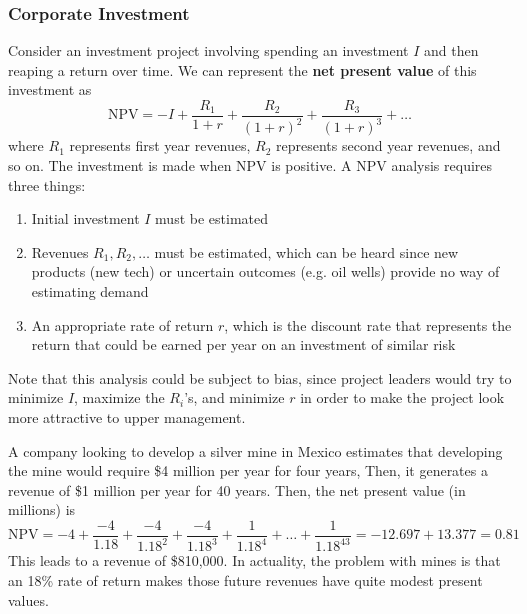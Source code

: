 \documentclass{article}
\begin{document}
    \subsubsection{Corporate Investment}

      \begin{definition}
        \label{def:npv-analysis}
        Consider an investment project involving spending an investment $I$ and then reaping a return over time. We can represent the \textbf{net present value} of this investment as 
        \begin{equation}
          \text{NPV} = -I + \frac{R_1}{1+r} + \frac{R_2}{(1+r)^2} + \frac{R_3}{(1+r)^3} + \ldots
        \end{equation}
        where $R_1$ represents first year revenues, $R_2$ represents second year revenues, and so on. The investment is made when NPV is positive. A NPV analysis requires three things:
        \begin{enumerate}
          \item Initial investment $I$ must be estimated
          \item Revenues $R_1, R_2, \ldots$ must be estimated, which can be heard since new products (new tech) or uncertain outcomes (e.g. oil wells) provide no way of estimating demand
          \item An appropriate rate of return $r$, which is the discount rate that represents the return that could be earned per year on an investment of similar risk
        \end{enumerate}
        Note that this analysis could be subject to bias, since project leaders would try to minimize $I$, maximize the $R_i$'s, and minimize $r$ in order to make the project look more attractive to upper management. 
      \end{definition}

      \begin{example}
        \label{ex:silver-mine}
        A company looking to develop a silver mine in Mexico estimates that developing the mine would require \$4 million per year for four years, Then, it generates a revenue of \$1 million per year for 40 years. Then, the net present value (in millions) is 
        \begin{equation}
          \text{NPV} = -4 + \frac{-4}{1.18} + \frac{-4}{1.18^2} + \frac{-4}{1.18^3} + \frac{1}{1.18^4} + \ldots + \frac{1}{1.18^{43}} = -12.697 + 13.377 = 0.81
        \end{equation}
        This leads to a revenue of \$810,000. In actuality, the problem with mines is that an 18\% rate of return makes those future revenues have quite modest present values. 
      \end{example}
\end{document}
